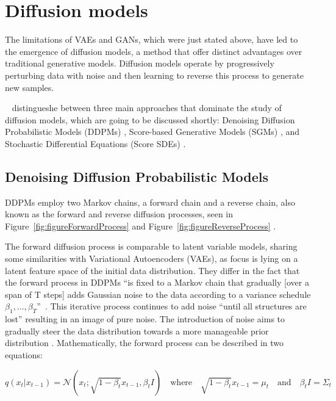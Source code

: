 \section{Diffusion models}\label{diffusion Models}

The limitations of VAEs and GANs, which were just stated above, have led to the emergence of diffusion models, a method that offer distinct advantages over traditional generative models. Diffusion models operate by progressively perturbing data with noise and then learning to reverse this process to generate new samples. 

~\cite{yangdiffusionSummary} distingueshe between three main approaches that dominate the study of diffusion models, which are going to be discussed shortly: Denoising Diffusion Probabilistic Models (DDPMs) \citep{hoDDPMs,sohlDDPM}, Score-based Generative Models (SGMs) \citep{song2019SGM}, and Stochastic Differential Equations (Score SDEs) \citep{song2020score, song2021maximum}.

\subsection{Denoising Diffusion Probabilistic Models}
DDPMs employ two Markov chains, a forward chain and a reverse chain, also known as the forward and reverse diffusion processes, seen in Figure~\ref{fig:figureForwardProcess} and Figure~\ref{fig:figureReverseProcess} \citep{sohlDDPM}. 

The forward diffusion process is comparable to latent variable models, sharing some similarities with Variational Autoencoders (VAEs), as focus is lying on a latent feature space of the initial data distribution. They differ in the fact that the forward process in DDPMs ``is fixed to a Markov chain that gradually [over a span of T steps] adds Gaussian noise to the data according to a variance schedule \(\beta_1, \ldots, \beta_T \)''~\cite{hoDDPMs}. This iterative process continues to add noise ``until all structures are lost'' \citep{yangdiffusionSummary} resulting in an image of pure noise. The introduction of noise aims to gradually steer the data distribution towards a more manageable prior distribution \citep{yangdiffusionSummary, pooleDreamfusion}. Mathematically, the forward process can be described in two equations:

\[
q(x_t | x_{t-1}) = \mathcal{N}(x_t; \sqrt{1 - \beta_t}x_{t-1}, \beta_t I) \quad \text{where} \quad \sqrt{1 - \beta_t}x_{t-1} = \mu_t \quad \text{and} \quad \beta_t I = \Sigma_t
\] 

